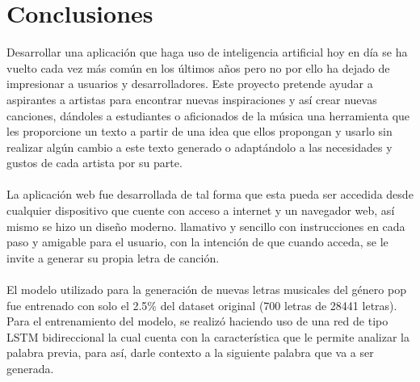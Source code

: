 \documentclass[12pt, a4paper, titlepage]{report}
\begin{document}
\chapter{\textcolor{azulescom}{Conclusiones}}

Desarrollar una aplicación que haga uso de inteligencia artificial hoy en día se ha vuelto cada vez más común en los últimos años pero no por ello ha dejado de impresionar a usuarios y desarrolladores. Este proyecto pretende ayudar a aspirantes a artistas para encontrar nuevas inspiraciones y así crear nuevas canciones, dándoles a estudiantes o aficionados de la música una herramienta que les proporcione un texto a partir de una idea que ellos propongan y usarlo sin realizar algún cambio a este texto generado o adaptándolo a las necesidades y gustos de cada artista por su parte.\\\\
La aplicación web fue desarrollada de tal forma que esta pueda ser accedida desde cualquier dispositivo que cuente con acceso a internet y un navegador web, así mismo se hizo un diseño moderno. llamativo y sencillo con instrucciones en cada paso y amigable para el usuario, con la intención de que cuando acceda, se le invite a generar su propia letra de canción. \\\\
El modelo utilizado para la generación de nuevas letras musicales del género pop fue entrenado con solo el 2.5\% del dataset original (700 letras de 28441 letras). Para el entrenamiento del modelo, se realizó haciendo uso de una red de tipo LSTM bidireccional la cual cuenta con la característica que le permite analizar la palabra previa, para así, darle contexto a la siguiente palabra que va a ser generada. \\\\
\end{document}
